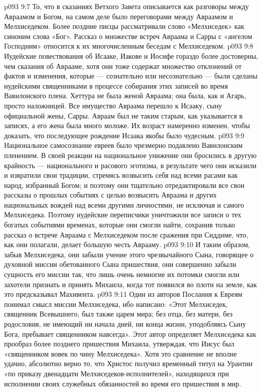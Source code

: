 \vs p093 9:7 То, что в сказаниях Ветхого Завета описывается как разговоры между Авраамом и Богом, на самом деле было переговорами между Авраамом и Мелхиседеком. Более поздние писцы рассматривали слово «Мелхиседек» как синоним слова «Бог». Рассказ о множестве встреч Авраама и Сарры с «ангелом Господним» относится к их многочисленным беседам с Мелхиседеком.
\vs p093 9:8 Иудейские повествования об Исааке, Иакове и Иосифе гораздо более достоверны, чем сказания об Аврааме, хотя они тоже содержат множество отклонений от фактов и изменения, которые --- сознательно или несознательно --- были сделаны иудейскими священниками в процессе собирания этих записей во время Вавилонского плена. Хеттура не была женой Авраама; она была, как и Агарь, просто наложницей. Все имущество Авраама перешло к Исааку, сыну официальной жены, Сарры. Авраам был не таким старым, как указывается в записях, а его жена была много моложе. Их возраст намеренно изменен, чтобы доказать, что последующее рождение Исаака якобы было чудесным.
\vs p093 9:9 \pc Национальное самосознание евреев было чрезмерно подавлено Вавилонским пленением. В своей реакции на национальное унижение они бросились в другую крайность --- национального и расового эготизма, в результате чего они исказили и извратили свои традиции, стремясь возвысить себя над всеми расами как народ, избранный Богом; и поэтому они тщательно отредактировали все свои рассказы о прошлых событиях с целью возвысить Авраама и других национальных вождей над всеми другими личностями, не исключая и самого Мелхиседека. Поэтому иудейские переписчики уничтожили все записи о тех богатых событиями временах, которые они смогли найти, сохранив только рассказ о встрече Авраама с Мелхиседеком после сражения при Сиддиме, что, как они полагали, делает большую честь Аврааму.
\vs p093 9:10 И таким образом, забыв Мелхиседека, они забыли учение этого чрезвычайного Сына, говорящее о духовной миссии обетованного Сына пришествия, они совершенно забыли сущность его миссии так, что лишь очень немногие их потомки смогли или захотели признать и принять Михаила, когда тот появился во плоти на земле, как это предсказывал Махивента.
\vs p093 9:11 Один из авторов Послания к Евреям понимал смысл миссии Мелхиседека, ибо написано: «Этот Мелхиседек, священник Всевышнего, был также царем мира; без отца, без матери, без родословия, не имеющий ни начала дней, ни конца жизни, уподобляясь Сыну Бога, пребывает священником навсегда». Этот автор определяет Мелхиседека как прообраз более позднего пришествия Михаила, утверждая, что Иисус был «священником вовек по чину Мелхиседека». Хотя это сравнение не вполне удачно, абсолютно верно то, что Христос получил временный титул на Урантии «по приказу двенадцати Мелхиседеков\hyp{}исполнителей», находящихся при исполнении своих служебных обязанностей во время его пришествия в мир.
